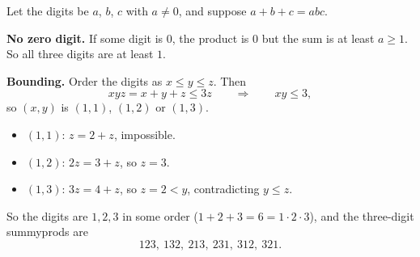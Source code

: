 Let the digits be $a$, $b$, $c$ with $a\ne0$, and suppose $a+b+c=abc$.

\textbf{No zero digit.} If some digit is $0$, the product is $0$ but the sum is at least $a\ge1$. So all three digits are at least $1$.

\textbf{Bounding.} Order the digits as $x\le y\le z$. Then
\[
xyz=x+y+z\le3z\qquad\Longrightarrow\qquad xy\le3 ,
\]
so $(x,y)$ is $(1,1)$, $(1,2)$ or $(1,3)$.
\begin{itemize}
\item $(1,1)$: $z=2+z$, impossible.
\item $(1,2)$: $2z=3+z$, so $z=3$.
\item $(1,3)$: $3z=4+z$, so $z=2<y$, contradicting $y\le z$.
\end{itemize}
So the digits are $1,2,3$ in some order ($1+2+3=6=1\cdot2\cdot3$), and the three-digit summyprods are
\[
\boxed{123,\ 132,\ 213,\ 231,\ 312,\ 321}.
\]
